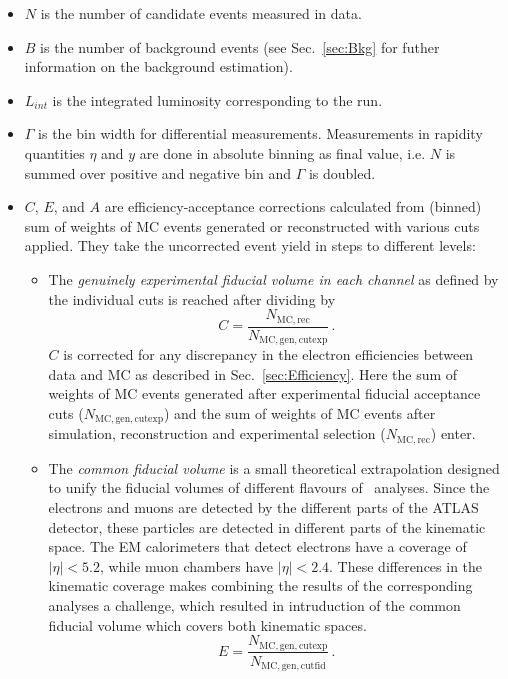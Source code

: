 \begin{itemize}
\item {\bfseries $N$} is the number of candidate events measured in data.
\item {\bfseries $B$} is the number of background events (see Sec.~\ref{sec:Bkg} for futher information on the background estimation).
\item {\bfseries $L_{int}$} is the integrated luminosity corresponding to the run.
\item {\bfseries $\Gamma$} is the bin width for differential measurements. Measurements in rapidity quantities $\eta$ and $y$ are done in absolute binning as final value, i.e. $N$ is summed over positive and negative bin and $\Gamma$ is doubled.
\item $C$, $E$, and $A$ are efficiency-acceptance corrections calculated from (binned) sum of weights of MC events generated or reconstructed with various cuts applied. They take the uncorrected event yield in steps to different levels:
  \begin{itemize}
  \item The \textit{genuinely experimental fiducial volume in each channel} as defined by the individual cuts is reached after dividing by
    \begin{equation}
      C = \frac{N_\mathrm{MC, rec}}{N_\mathrm{MC, gen, cutexp}}\,.
    \end{equation}
    $C$ is corrected for any discrepancy in the electron efficiencies between data and MC as described in Sec.~\ref{sec:Efficiency}. Here the sum of weights of MC events generated after experimental fiducial acceptance cuts ($N_\mathrm{MC, gen, cutexp}$) and the sum of weights of MC events after simulation, reconstruction and experimental selection ($N_\mathrm{MC, rec}$) enter.
  \item The \textit{common fiducial volume} is a small theoretical extrapolation designed to unify the fiducial volumes of different flavours of \Zll\ analyses. Since the electrons and muons are detected by the different parts of the ATLAS detector, these particles are detected in different parts of the kinematic space. The EM calorimeters that detect electrons have a coverage of $|\eta| < 5.2$, while muon chambers have $|\eta| < 2.4$. These differences in the kinematic coverage makes combining the results of the corresponding analyses a challenge, which resulted in intruduction of the common fiducial volume which covers both kinematic spaces.
    \begin{equation}
      E = \frac{N_\mathrm{MC, gen, cutexp}}{N_\mathrm{MC, gen, cutfid}}\,.

\end{equation}
\end{itemize}
\end{itemize}
